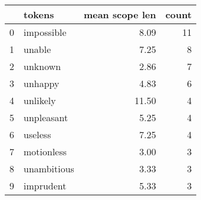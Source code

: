 \begin{tabular}{llrr}
\toprule
{} &       tokens &  mean scope len &  count \\
\midrule
0 &   impossible &            8.09 &     11 \\
1 &       unable &            7.25 &      8 \\
2 &      unknown &            2.86 &      7 \\
3 &      unhappy &            4.83 &      6 \\
4 &     unlikely &           11.50 &      4 \\
5 &   unpleasant &            5.25 &      4 \\
6 &      useless &            7.25 &      4 \\
7 &   motionless &            3.00 &      3 \\
8 &  unambitious &            3.33 &      3 \\
9 &    imprudent &            5.33 &      3 \\
\bottomrule
\end{tabular}
